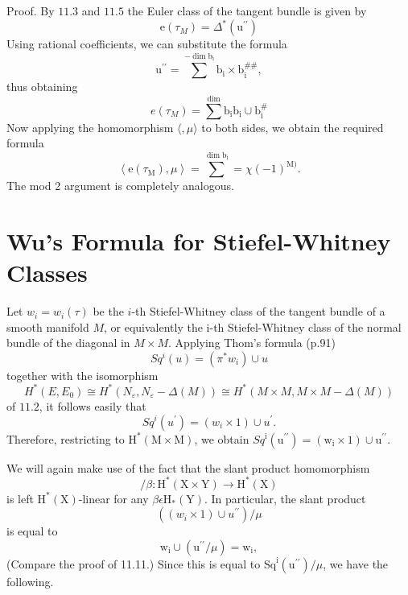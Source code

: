 \documentclass[10pt]{article}
\begin{document}
Proof. By $11.3$ and $11.5$ the Euler class of the tangent bundle is given by
$$
\mathrm{e}\left(\tau_{M}\right)=\Delta^{*}\left(\mathrm{u}^{\prime \prime}\right)
$$
Using rational coefficients, we can substitute the formula
$$
\mathrm{u}^{\prime \prime}=\sum^{-\operatorname{dim} \mathrm{b}_{\mathrm{i}}} \mathrm{b}_{\mathrm{i}} \times \mathrm{b}_{\mathrm{i}}^{\# \#},
$$
thus obtaining
$$
e\left(\tau_{M}\right)=\sum^{\operatorname{dim}} \mathrm{b}_{\mathrm{i}} \mathrm{b}_{\mathrm{i}} \cup \mathrm{b}_{\mathrm{i}}^{\#}
$$
Now applying the homomorphism $\langle, \mu\rangle$ to both sides, we obtain the required formula
$$
\left\langle\mathrm{e}\left(\tau_{\mathrm{M}}\right), \mu\right\rangle=\sum^{\operatorname{dim} \mathrm{b}_{\mathrm{i}}}=\chi(-1)^{\mathrm{M})} .
$$
The mod 2 argument is completely analogous.

\section{Wu's Formula for Stiefel-Whitney Classes}
Let $w_{i}=w_{i}(\tau)$ be the $i$-th Stiefel-Whitney class of the tangent bundle of a smooth manifold $M$, or equivalently the i-th Stiefel-Whitney class of the normal bundle of the diagonal in $M \times M$. Applying Thom's formula (p.91)
$$
S q^{i}(u)=\left(\pi^{*} w_{i}\right) \cup u
$$
together with the isomorphism
$$
H^{*}\left(E, E_{0}\right) \cong H^{*}\left(N_{\varepsilon}, N_{\varepsilon}-\Delta(M)\right) \cong H^{*}(M \times M, M \times M-\Delta(M))
$$
of $11.2$, it follows easily that
$$
S q^{i}\left(u^{\prime}\right)=\left(w_{i} \times 1\right) \cup u^{\prime} .
$$
Therefore, restricting to $\mathrm{H}^{*}(\mathrm{M} \times \mathrm{M})$, we obtain $S q^{\mathrm{i}}\left(\mathrm{u}^{\prime \prime}\right)=\left(\mathrm{w}_{\mathrm{i}} \times 1\right) \cup \mathrm{u}^{\prime \prime}$.

We will again make use of the fact that the slant product homomorphism
$$
/ \beta: \mathrm{H}^{*}(\mathrm{X} \times \mathrm{Y}) \rightarrow \mathrm{H}^{*}(\mathrm{X})
$$
is left $\mathrm{H}^{*}(\mathrm{X})$-linear for any $\beta \epsilon \mathrm{H}_{*}(\mathrm{Y})$. In particular, the slant product
$$
\left(\left(w_{i} \times 1\right) \cup u^{\prime \prime}\right) / \mu
$$
is equal to
$$
\mathrm{w}_{\mathrm{i}} \cup\left(\mathrm{u}^{\prime \prime} / \mu\right)=\mathrm{w}_{\mathrm{i}},
$$
(Compare the proof of 11.11.) Since this is equal to $\mathrm{Sq}^{\mathrm{i}}\left(\mathrm{u}^{\prime \prime}\right) / \mu$, we have the following.
\end{document}
